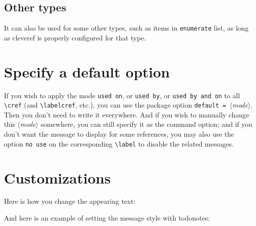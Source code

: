 \documentclass[
    use style = plain,
    title in boldface,
    emphasize theorems,
    simple name,
]{einfart}
\newcommand{\meta}[1]{$\langle${\normalfont\itshape#1}$\rangle$}
\newcommand{\packageoption}[1]{\texttt{\textcolor{code-option}{#1}}}
\newcommand{\commandoption}[1]{\texttt{\textcolor{code-keys}{#1}}}
\begin{document}
\subsection{Other types}

It can also be used for some other types, such as items in \texttt{enumerate} list, as long as \textsf{cleveref} is properly configured for that type.

\section{Specify a default option}

If you wish to apply the mode \commandoption{used on}, or \commandoption{used by}, or \commandoption{used by and on} to all \lstinline|\cref| (and \lstinline|\labelcref|, etc.), you can use the package option \packageoption{default = }\meta{mode}. Then you don't need to write it everywhere. And if you wish to manually change this \meta{mode} somewhere, you can still specify it as the command option; and if you don't want the message to display for some references, you may also use the option \commandoption{no use} on the corresponding \lstinline|\label| to disable the related messages.


\section{Customizations}

Here is how you change the appearing text:

\begin{code}
\end{code}


\bigskip
And here is an example of setting the message style with \textsf{todonotes}:

\begin{code}
\SetForwardReferenceStyle
  {%
  }
\SetForwardReferenceStyleOutsideMath
  {%
  }
\end{code}
\end{document}
